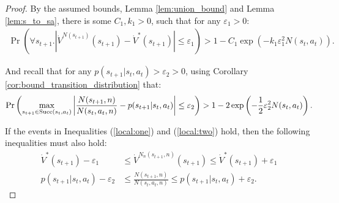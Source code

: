     \begin{proof}
        By the assumed bounds, Lemma \ref{lem:union_bound} and Lemma \ref{lem:s_to_sa}, there is some $C_1,k_1>0$, such that for any $\varepsilon_1 >0$:
        \begin{align}
            \Pr\left(\forall s_{t+1}. \left|\dot{V}^{N(s_{t+1})}(s_{t+1})-\dot{V}^*(s_{t+1}) \right| \leq \varepsilon_1 \right) > 1-C_1\exp(-k_1\varepsilon_1^2 N(s_t,a_t)). \label{local:one}
        \end{align}

        And recall that for any $p(s_{t+1}|s_t,a_t) > \varepsilon_2>0$, using Corollary \ref{cor:bound_transition_distribution} that:
        \begin{align}
            \Pr\left(\max_{s_{t+1}\in{\textnormal{Succ}(s_t,a_t)}} 
                \left| \frac{N(s_{t+1},n)}{N(s_t,a_t,n)} - p(s_{t+1}|s_t,a_t) \right| 
                \leq \varepsilon_2 \right) 
                    > 1 - 2 \exp\left(-\frac{1}{2}\varepsilon_2^2 N(s_t,a_t) \right). \label{local:two}
        \end{align}
        
        If the events in Inequalities (\ref{local:one}) and (\ref{local:two}) hold, then the following inequalities must also hold:
        \begin{align}
            \dot{V}^*(s_{t+1})- \varepsilon_1 
                &\leq \dot{V}^{N_n(s_{t+1},n)}(s_{t+1}) 
                \leq \dot{V}^*(s_{t+1})+ \varepsilon_1 \\
            p(s_{t+1}|s_t,a_t) - \varepsilon_2 
                &\leq \frac{N(s_{t+1},n)}{N(s_t,a_t,n)} 
                \leq p(s_{t+1}|s_t,a_t) + \varepsilon_2.
        \end{align} 
        

\end{proof}
